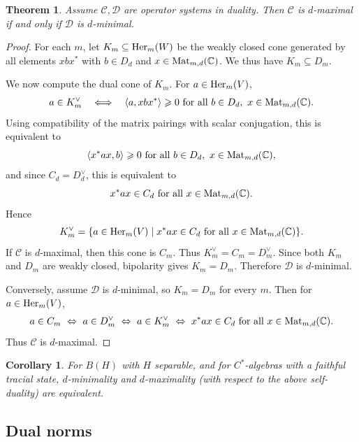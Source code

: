 \documentclass[11pt,onecolumn]{article}
\theoremstyle{plain}
\newtheorem{theorem}{Theorem}[section]
\newtheorem{corollary}[corollary]{Corollary}
\theoremstyle{definition}
\begin{document}
\begin{theorem}
    Assume $\mathcal C,\mathcal D$ are operator systems in duality. Then $\mathcal C$ is $d$-maximal if and only if $\mathcal D$ is $d$-minimal.
\end{theorem}
\begin{proof}
    For each $m$, let $K_m\subseteq {\rm Her}_m(W)$ be the weakly closed cone
    generated by all elements $xbx^*$ with
    $b\in D_d$ and $x\in{\rm Mat}_{m,d}(\mathbb C)$.  We thus have $K_m\subseteq D_m$.

    We now compute the dual cone of $K_m$.  For $a\in{\rm Her}_m(V)$,
    \[
        a\in K_m^\vee
        \quad\Longleftrightarrow\quad
        \langle a,xbx^*\rangle\geqslant 0
        \text{ for all }b\in D_d,
        \ x\in{\rm Mat}_{m,d}(\mathbb C).
    \]
    Using compatibility of the matrix pairings with scalar conjugation, this
    is equivalent to
    \[
        \langle x^*ax,b\rangle\geqslant 0
        \text{ for all }b\in D_d,
        \ x\in{\rm Mat}_{m,d}(\mathbb C),
    \]
    and since $C_d=D_d^\vee$, this is equivalent to
    \[
        x^*ax\in C_d
        \text{ for all }x\in{\rm Mat}_{m,d}(\mathbb C).
    \]
    Hence
    \[
        K_m^\vee
        =\{a\in{\rm Her}_m(V)\mid x^*ax\in C_d
        \text{ for all }x\in{\rm Mat}_{m,d}(\mathbb C)\}.
    \]
    If $\mathcal C$ is $d$-maximal, then this cone is $C_m$.  Thus
    $K_m^\vee=C_m=D_m^\vee$.  Since both $K_m$ and $D_m$ are weakly closed,
    bipolarity gives $K_m=D_m$.  Therefore $\mathcal D$ is $d$-minimal.

    Conversely, assume $\mathcal D$ is $d$-minimal, so $K_m=D_m$ for every
    $m$.  Then for $a\in{\rm Her}_m(V)$,
    \[
        a\in C_m
        \ \Leftrightarrow\
        a\in D_m^\vee
        \ \Leftrightarrow\
        a\in K_m^\vee
        \ \Leftrightarrow\
        x^*ax\in C_d
        \text{ for all }x\in{\rm Mat}_{m,d}(\mathbb C).
    \]
    Thus $\mathcal C$ is $d$-maximal.
\end{proof}

\begin{corollary}
    For $B(H)$ with $H$ separable, and for $C^*$-algebras with a faithful tracial state,  $d$-minimality and $d$-maximality (with respect to the above self-duality) are equivalent.
\end{corollary}

\iffalse %
\subsection{Dual norms}
\end{document}
